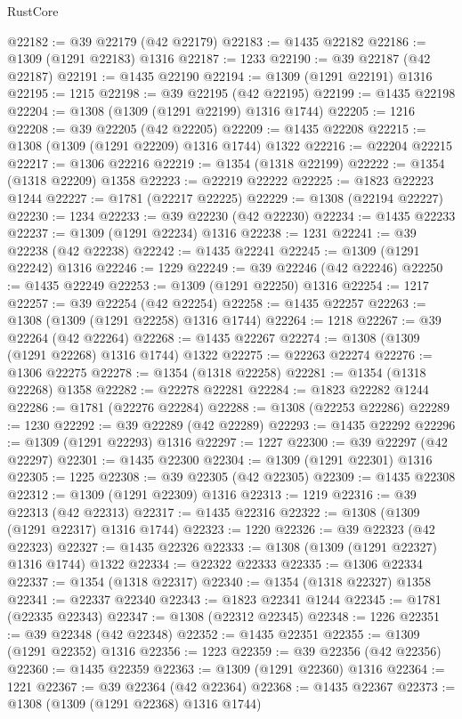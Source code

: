 \begin{lexlean}{RustCore}
\begin{coremodule}
@22182 := @39 @22179 (@42 @22179)
@22183 := @1435 @22182
@22186 := @1309 (@1291 @22183) @1316
@22187 := 1233
@22190 := @39 @22187 (@42 @22187)
@22191 := @1435 @22190
@22194 := @1309 (@1291 @22191) @1316
@22195 := 1215
@22198 := @39 @22195 (@42 @22195)
@22199 := @1435 @22198
@22204 := @1308 (@1309 (@1291 @22199) @1316 @1744)
@22205 := 1216
@22208 := @39 @22205 (@42 @22205)
@22209 := @1435 @22208
@22215 := @1308 (@1309 (@1291 @22209) @1316 @1744) @1322
@22216 := @22204 @22215
@22217 := @1306 @22216
@22219 := @1354 (@1318 @22199)
@22222 := @1354 (@1318 @22209) @1358
@22223 := @22219 @22222
@22225 := @1823 @22223 @1244
@22227 := @1781 (@22217 @22225)
@22229 := @1308 (@22194 @22227)
@22230 := 1234
@22233 := @39 @22230 (@42 @22230)
@22234 := @1435 @22233
@22237 := @1309 (@1291 @22234) @1316
@22238 := 1231
@22241 := @39 @22238 (@42 @22238)
@22242 := @1435 @22241
@22245 := @1309 (@1291 @22242) @1316
@22246 := 1229
@22249 := @39 @22246 (@42 @22246)
@22250 := @1435 @22249
@22253 := @1309 (@1291 @22250) @1316
@22254 := 1217
@22257 := @39 @22254 (@42 @22254)
@22258 := @1435 @22257
@22263 := @1308 (@1309 (@1291 @22258) @1316 @1744)
@22264 := 1218
@22267 := @39 @22264 (@42 @22264)
@22268 := @1435 @22267
@22274 := @1308 (@1309 (@1291 @22268) @1316 @1744) @1322
@22275 := @22263 @22274
@22276 := @1306 @22275
@22278 := @1354 (@1318 @22258)
@22281 := @1354 (@1318 @22268) @1358
@22282 := @22278 @22281
@22284 := @1823 @22282 @1244
@22286 := @1781 (@22276 @22284)
@22288 := @1308 (@22253 @22286)
@22289 := 1230
@22292 := @39 @22289 (@42 @22289)
@22293 := @1435 @22292
@22296 := @1309 (@1291 @22293) @1316
@22297 := 1227
@22300 := @39 @22297 (@42 @22297)
@22301 := @1435 @22300
@22304 := @1309 (@1291 @22301) @1316
@22305 := 1225
@22308 := @39 @22305 (@42 @22305)
@22309 := @1435 @22308
@22312 := @1309 (@1291 @22309) @1316
@22313 := 1219
@22316 := @39 @22313 (@42 @22313)
@22317 := @1435 @22316
@22322 := @1308 (@1309 (@1291 @22317) @1316 @1744)
@22323 := 1220
@22326 := @39 @22323 (@42 @22323)
@22327 := @1435 @22326
@22333 := @1308 (@1309 (@1291 @22327) @1316 @1744) @1322
@22334 := @22322 @22333
@22335 := @1306 @22334
@22337 := @1354 (@1318 @22317)
@22340 := @1354 (@1318 @22327) @1358
@22341 := @22337 @22340
@22343 := @1823 @22341 @1244
@22345 := @1781 (@22335 @22343)
@22347 := @1308 (@22312 @22345)
@22348 := 1226
@22351 := @39 @22348 (@42 @22348)
@22352 := @1435 @22351
@22355 := @1309 (@1291 @22352) @1316
@22356 := 1223
@22359 := @39 @22356 (@42 @22356)
@22360 := @1435 @22359
@22363 := @1309 (@1291 @22360) @1316
@22364 := 1221
@22367 := @39 @22364 (@42 @22364)
@22368 := @1435 @22367
@22373 := @1308 (@1309 (@1291 @22368) @1316 @1744)

\end{coremodule}
\end{lexlean}
